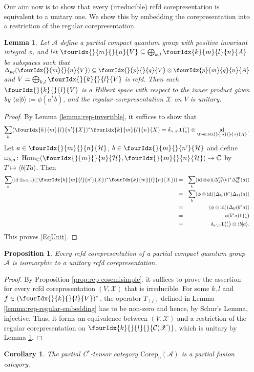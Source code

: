 \documentclass[10pt]{article}
\DeclareMathOperator{\id}{id}
\DeclareMathOperator{\Hom}{Hom}
\DeclareMathOperator{\op}{\mathrm{op}}
\newcommand{\dual}[1]{#1^{*}}
\newcommand{\Corep}{\mathrm{Corep}}
\newcommand{\C}{\mathbb{C}}
\newcommand{\Hsp}{\mathcal{H}}
\newcommand{\Grt}[3]{#1{\tiny{\begin{pmatrix} #2\\#3\end{pmatrix}}}}
\newcommand{\UnitC}[2]{\Grt{\mathbf{1}}{#1}{#2}}
\newcommand{\Gr}[5]{\fourIdx{#2}{#4}{#3}{#5}{#1}}%
\newcommand{\Gru}[3]{\Gr{#1}{}{}{#2}{#3}}
\newcommand{\Grd}[3]{\Gr{#1}{#2}{#3}{}{}}
\newtheorem{Lem}[Theorem]{Lemma}
\newtheorem{Prop}[Theorem]{Proposition}
\newtheorem{Cor}[Theorem]{Corollary}
\theoremstyle{definition}
\numberwithin{equation}{section}
\begin{document}
Our aim now is to show that every (irreducible) rcfd corepresentation is
equivalent to a unitary one. We show this by embedding the
corepresentation into a restriction of the regular corepresentation.
\begin{Lem} \label{lemma:rep-regular-unitary}
  Let $\mathscr{A}$ define a partial compact quantum group with
positive invariant  integral $\phi$, and let $\Gru{V}{m}{n} \subseteq
\bigoplus_{k,l} \Gr{A}{k}{l}{m}{n}$ be subspaces such that
$\Delta_{pq}(\Gru{V}{m}{n}) \subseteq \Gru{V}{p}{q} \otimes
    \Gr{A}{p}{q}{m}{n}$ and $V=\bigoplus_{k,l} \Gru{V}{k}{l}$ is rcfd. Then each $\Gru{V}{k}{l}$ is a Hilbert space with
    respect to the inner product given by $\langle
    a|b\rangle:=\phi(a^{*}b)$, and the regular corepresentation
    $\mathscr{X}$ on $V$ is unitary.
\end{Lem}
\begin{proof} 
By Lemma \ref{lemma:rep-invertible},  it suffices to show that
  \begin{equation}\label{EqUnit} \sum_{k}
    (\Gr{X}{k}{l}{m}{n'})^* \Gr{X}{k}{l}{m}{n} =
    \delta_{n,n'}\UnitC{l}{n}\otimes
    \id_{\Gru{\Hsp}{m}{n}}.
  \end{equation} 
Let  $a\in \Gru{\Hsp}{m}{n}$, $b\in \Gru{\Hsp}{m}{n'}$ and define $\omega_{b,a} \colon
\Hom_{\C}(\Gru{\Hsp}{m}{n},\Gru{\Hsp}{m}{n}) \to \C$ by $T
\mapsto \langle b|Ta\rangle$. Then
\begin{eqnarray*}
\sum_{k }(\id \otimes \omega_{b,a})
((\Gr{X}{k}{l}{m}{n'})^* \Gr{X}{k}{l}{m}{n}))  &=& \sum_k
(\id\otimes \phi)(\Delta_{kl}^{\op}(b)^*\Delta_{kl}^{\op}(a))\\
  &=& \sum_k (\phi\otimes
  \id)(\Delta_{lk}(b^*)\Delta_{kl}(a)) \\ &=& (\phi\otimes
  \id)(\Delta_{ll}(b^*a)) \\ &=& \phi(b^*a)\UnitC{l}{n} \\&=&
  \delta_{n',n} \UnitC{l}{n} \otimes \langle b|a\rangle.
\end{eqnarray*} 
This proves \eqref{EqUnit}.
\end{proof} 

\begin{Prop} \label{prop:rep-unitarisable} Every  rcfd
  corepresentation of a partial compact quantum group $\mathscr{A}$ is
  isomorphic to a unitary rcfd corepresentation.
\end{Prop}
\begin{proof}
  By Proposition \ref{prop:rep-cosemisimple}, it suffices to prove the
  assertion for every rcfd corepresentation $(V,\mathscr{X})$ that is
  irreducible.  For some $k,l$ and $f \in
  \dual{(\Gru{V}{k}{l})}$, the operator $T_{(f)}$ defined in
  Lemma \ref{lemma:rep-regular-embedding} has to be non-zero and
  hence, by Schur's Lemma, injective. Thus, it forms an equivalence
  between $(V,\mathscr{X})$ and a restriction of the regular
  corepresentation on $\Grd{\mathcal{C}(\mathscr{X})}{k}{l}$, which is
  unitary by Lemma \ref{lemma:rep-regular-unitary}.
\end{proof}
\begin{Cor} The partial C$^*$-tensor category $\Corep_u(\mathscr{A})$ is a partial fusion category.
\end{Cor}
\end{document}

